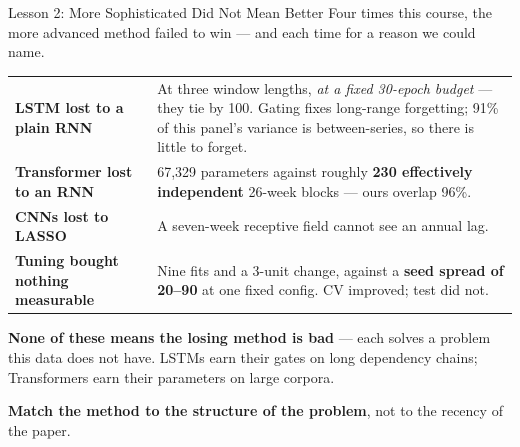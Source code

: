 \documentclass[aspectratio=169, 11pt]{beamer}
\begin{document}
\begin{frame}{Lesson 2: More Sophisticated Did Not Mean Better}
  Four times this course, the more advanced method failed to win --- and each time for a reason we
  could name.
  \begin{center}
    {\small
    \begin{tabular}{p{3.6cm}p{8.7cm}}
      \toprule
      \textbf{LSTM lost to a plain RNN} & At three window lengths, \emph{at a fixed 30-epoch
      budget} --- they tie by 100. Gating fixes long-range forgetting; 91\% of this panel's
      variance is between-series, so there is little to forget. \\[3pt]
      \textbf{Transformer lost to an RNN} & 67{,}329 parameters against roughly \textbf{230
      effectively independent} 26-week blocks --- ours overlap 96\%. \\[3pt]
      \textbf{CNNs lost to LASSO} & A seven-week receptive field cannot see an annual lag. \\[3pt]
      \textbf{Tuning bought nothing measurable} & Nine fits and a 3-unit change, against a
      \textbf{seed spread of 20--90} at one fixed config. CV improved; test did not. \\
      \bottomrule
    \end{tabular}
    }
  \end{center}

  \vspace{0.05cm}
  \textbf{None of these means the losing method is bad} --- each solves a problem this data does
  not have. LSTMs earn their gates on long dependency chains; Transformers earn their parameters
  on large corpora.

  \vspace{0.05cm}
  \textbf{Match the method to the structure of the problem}, not to the recency of the paper.
\end{frame}
\end{document}
